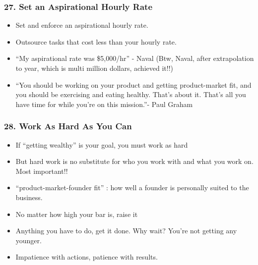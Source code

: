 \begin{frame}[fragile]
\frametitle{27. Set an Aspirational Hourly Rate}
\begin{itemize}
\item Set and enforce an aspirational hourly rate.
\item Outsource tasks that cost less than your hourly rate.
\item ``My aspirational rate was \$5,000/hr'' - Naval (Btw, Naval, after extrapolation to year, which is multi million dollars, achieved it!!)
\item ``You should be working on your product and
getting product-market fit, and you should be exercising and eating healthy. That's about it. That's all you have time for while you're on this mission.''- Paul Graham
\end{itemize}
\end{frame}

\begin{frame}[fragile]
\frametitle{28. Work As Hard As You Can}
\begin{itemize}
\item If ``getting wealthy'' is your goal, you must work as hard 
\item But hard work is no substitute for who you work with and what you work on. Most important!!
\item  ``product-market-founder  fit'' : how well a founder is personally suited to the business.
\item No matter how high your bar is, raise it
\item Anything you have to do, get it done. Why wait? You're not getting any younger.
\item Impatience with actions, patience with results.
\end{itemize}
\end{frame}

